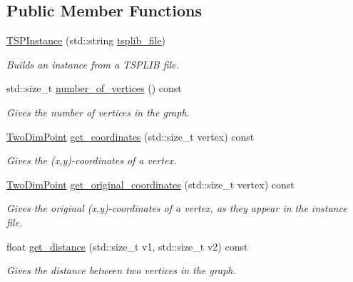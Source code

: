 \subsection*{Public Member Functions}
\begin{DoxyCompactItemize}
\item 
\hyperlink{classas_1_1tsplib_1_1TSPInstance_a5cc9de2e917ae7aa608e10b4375155d6}{T\+S\+P\+Instance} (std\+::string \hyperlink{classas_1_1tsplib_1_1TSPInstance_a6b2d4d7ad5e12825ceee49d32cdc28af}{tsplib\+\_\+file})
\begin{DoxyCompactList}\small\item\em Builds an instance from a T\+S\+P\+L\+IB file. \end{DoxyCompactList}\item 
std\+::size\+\_\+t \hyperlink{classas_1_1tsplib_1_1TSPInstance_a3beae0a769669c417e8bc7d1e41a7550}{number\+\_\+of\+\_\+vertices} () const
\begin{DoxyCompactList}\small\item\em Gives the number of vertices in the graph. \end{DoxyCompactList}\item 
\hyperlink{structas_1_1TwoDimPoint}{Two\+Dim\+Point} \hyperlink{classas_1_1tsplib_1_1TSPInstance_a36962fb85e309faa3efb28fae3b2956b}{get\+\_\+coordinates} (std\+::size\+\_\+t vertex) const
\begin{DoxyCompactList}\small\item\em Gives the (x,y)-\/coordinates of a vertex. \end{DoxyCompactList}\item 
\hyperlink{structas_1_1TwoDimPoint}{Two\+Dim\+Point} \hyperlink{classas_1_1tsplib_1_1TSPInstance_ace09ba6ff164a9569b95ebe772aeebfb}{get\+\_\+original\+\_\+coordinates} (std\+::size\+\_\+t vertex) const
\begin{DoxyCompactList}\small\item\em Gives the original (x,y)-\/coordinates of a vertex, as they appear in the instance file. \end{DoxyCompactList}\item 
float \hyperlink{classas_1_1tsplib_1_1TSPInstance_a52535b9ad72eaaac80f2a7a1518e680f}{get\+\_\+distance} (std\+::size\+\_\+t v1, std\+::size\+\_\+t v2) const
\begin{DoxyCompactList}\small\item\em Gives the distance between two vertices in the graph. \end{DoxyCompactList}\item 

\end{DoxyCompactItemize}
